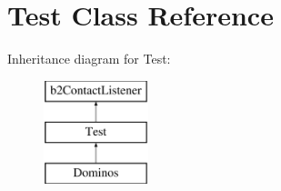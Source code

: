 \hypertarget{classTest}{\section{Test Class Reference}
\label{classTest}
}
Inheritance diagram for Test\-:\begin{figure}[H]
\begin{center}
\leavevmode
\includegraphics[height=3.000000cm]{classTest}
\end{center}
\end{figure}
